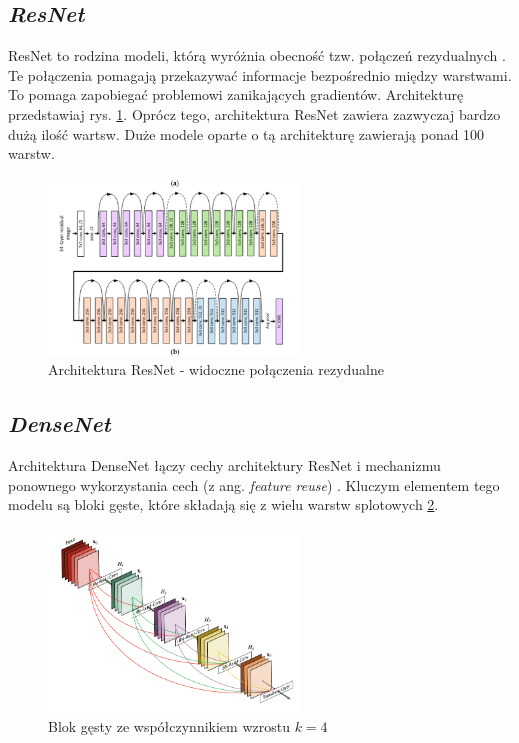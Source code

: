 \subsection{\textit{ResNet}}

ResNet to rodzina modeli, którą wyróżnia obecność tzw. połączeń rezydualnych \cite{resnet}. Te połączenia pomagają przekazywać informacje bezpośrednio między warstwami. To pomaga zapobiegać problemowi zanikających gradientów.
Architekturę przedstawiaj rys. \ref{fig:resnet}.
Oprócz tego, architektura ResNet zawiera zazwyczaj bardzo dużą ilość wartsw.
Duże modele oparte o tą architekturę zawierają ponad 100 warstw.

\begin{figure}
    \centering
    \includegraphics[width=0.6\textwidth]{resnet}
    \caption{Architektura ResNet - widoczne połączenia rezydualne}
    \label{fig:resnet}
\end{figure}

\subsection{\textit{DenseNet}}

Architektura DenseNet łączy cechy architektury ResNet i mechanizmu ponownego wykorzystania cech (z ang. \textit{feature reuse}) \cite{densenet}.
Kluczym elementem tego modelu są bloki gęste, które składają się z wielu warstw splotowych \ref{fig:denseblock}.

\begin{figure}
    \centering
    \includegraphics[width=0.6\textwidth]{denseblock}
    \caption{Blok gęsty ze współczynnikiem wzrostu $k = 4$}
    \label{fig:denseblock}
\end{figure}

